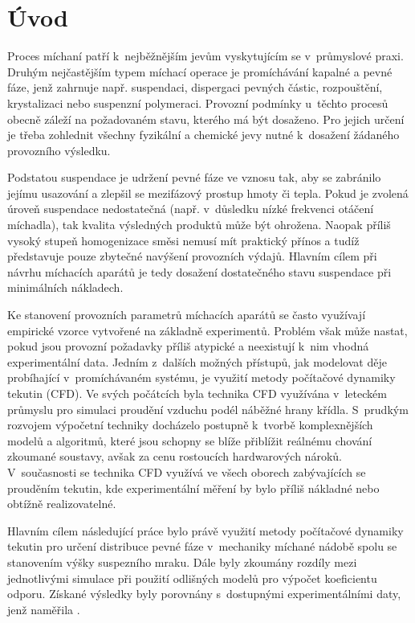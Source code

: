 \chapter{Úvod}
Proces míchaní patří k~nejběžnějším jevům vyskytujícím se v~průmyslové praxi. Druhým nejčastějším typem míchací operace je promíchávání kapalné a pevné fáze, jenž zahrnuje např. suspendaci, dispergaci pevných částic, rozpouštění, krystalizaci nebo sus\-pen\-zní polymeraci. Provozní podmínky u~těchto procesů obecně záleží na požadovaném stavu, kterého má být dosaženo. Pro jejich určení je třeba zohlednit všechny fyzikální a chemické jevy nutné k~dosažení žádaného provozního výsledku. 

Podstatou suspendace je udržení pevné fáze ve vznosu tak, aby se zabránilo jejímu usazování a zlepšil se mezifázový prostup hmoty či tepla. Pokud je zvolená úroveň suspendace nedostatečná (např. v~důsledku nízké frekvenci otáčení míchadla), tak kvalita výsledných produktů může být ohrožena. Naopak příliš vysoký stupeň homogenizace směsi nemusí mít praktický přínos a tudíž představuje pouze zbytečné navýšení provozních výdajů. Hlavním cílem při návrhu míchacích aparátů je tedy dosažení dostatečného stavu suspendace při minimálních nákladech. 

Ke stanovení provozních parametrů míchacích aparátů se často využívají empirické vzorce vytvořené na základně experimentů. Problém však může nastat, pokud jsou provozní po\-ža\-dav\-ky příliš atypické a neexistují k~nim vhodná experimentální data. Jedním z~dalších možných přístupů, jak modelovat děje pro\-bí\-ha\-jí\-cí v~promíchávaném systému, je využití metody po\-čí\-ta\-čo\-vé dynamiky tekutin (CFD). 
Ve svých počátcích byla technika CFD využívána v~leteckém průmyslu pro simulaci proudění vzduchu podél náběžné hrany křídla. 
S~prudkým rozvojem výpočetní techniky docházelo postupně k~tvorbě komplexnějších modelů a algoritmů, které jsou schopny se blíže přiblížit reálnému chování zkoumané soustavy, avšak za cenu rostoucích hardwarových nároků. V~současnosti se technika CFD využívá ve všech oborech zabývajících se prouděním tekutin, kde experimentální měření by bylo příliš nákladné nebo obtížně realizovatelné.   

Hlavním cílem následující práce bylo právě využití metody počítačové dynamiky tekutin pro určení distribuce pevné fáze v~mechaniky míchané nádobě spolu se stanovením výšky suspezního mraku. Dále byly zkoumány rozdíly mezi jednotlivými simulace při použití odlišných modelů pro výpočet koeficientu odporu.  Získané výsledky byly porovnány s~dostupnými experimentálními daty, jenž naměřila \citet{pav11}.
